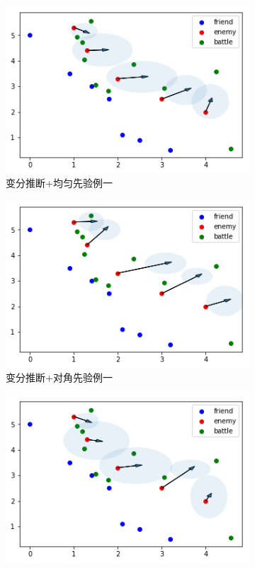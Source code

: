 \documentclass{sicnuthesis}
\begin{document}
\begin{figure}[htb]
  \begin{subfigure}[b]{0.45\linewidth}
    \includegraphics[width=\linewidth]{VI11.png}
    \caption{变分推断+均匀先验例一}
  \end{subfigure}
  \begin{subfigure}[b]{0.45\linewidth}
    \includegraphics[width=\linewidth]{VI12.png}
    \caption{变分推断+对角先验例一}
  \end{subfigure}
  \begin{subfigure}[b]{0.45\linewidth}
    \includegraphics[width=\linewidth]{VI21.png}

\end{subfigure}
\end{figure}
\end{document}
